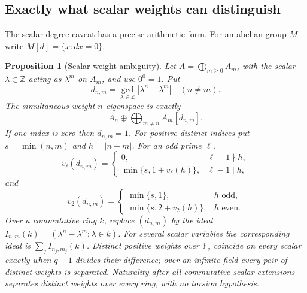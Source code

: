 \documentclass[11pt,a4paper]{article}
\newtheorem{proposition}[theorem]{Proposition}
\theoremstyle{definition}
\newcommand{\Z}{\mathbb Z}
\newcommand{\F}{\mathbb F}
\begin{document}


\subsection{Exactly what scalar weights can distinguish}
The scalar-degree caveat has a precise arithmetic form. For an abelian
 group $M$ write $M[d]=\{x:dx=0\}$.
\begin{proposition}[Scalar-weight ambiguity]\label{prop:scalar-weights}
Let $A=\bigoplus_{m\ge0}A_m$, with the scalar $\lambda\in\Z$ acting
as $\lambda^m$ on $A_m$, and use $0^0=1$. Put
\[
 d_{n,m}=\gcd_{\lambda\in\Z}|\lambda^n-\lambda^m|\quad(n\ne m).
\]
The simultaneous weight-$n$ eigenspace is exactly
\[
 A_n\oplus\bigoplus_{m\ne n}A_m[d_{n,m}].
\]
If one index is zero then $d_{n,m}=1$. For positive distinct indices
put $s=\min(n,m)$ and $h=|n-m|$. For an odd prime $\ell$,
\[
 v_\ell(d_{n,m})=
 \begin{cases}
 0,&\ell-1\nmid h,\\
 \min\{s,1+v_\ell(h)\},&\ell-1\mid h,
 \end{cases}
\]
and
\[
 v_2(d_{n,m})=
 \begin{cases}
 \min\{s,1\},&h\text{ odd},\\
 \min\{s,2+v_2(h)\},&h\text{ even}.
 \end{cases}
\]
Over a commutative ring $k$, replace $(d_{n,m})$ by the ideal
$I_{n,m}(k)=(\lambda^n-\lambda^m:\lambda\in k)$. For several
scalar variables the corresponding ideal is
$\sum_j I_{n_j,m_j}(k)$. Distinct positive weights over $\F_q$
coincide on every scalar exactly when $q-1$ divides their difference;
over an infinite field every pair of distinct weights is separated.
Naturality after all commutative scalar extensions separates distinct
weights over every ring, with no torsion hypothesis.
\end{proposition}
\end{document}
